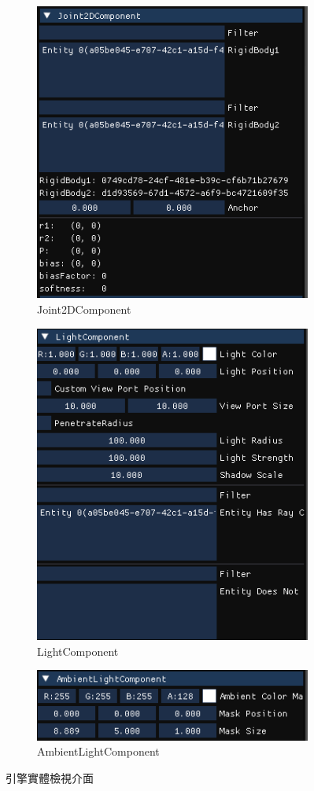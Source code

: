\begin{figure}[h]
\begin{subfigure}[b]{0.5\linewidth}
        \includegraphics[width=0.5\linewidth]{./resources/editor/ins_joint2D.png}
        \caption{Joint2DComponent}
    \end{subfigure}
    \begin{subfigure}[b]{0.5\linewidth}
        \includegraphics[width=0.5\linewidth]{./resources/editor/ins_light.png}
        \caption{LightComponent}
    \end{subfigure}
    \begin{subfigure}[b]{0.5\linewidth}
        \includegraphics[width=0.5\linewidth]{./resources/editor/ins_ambient.png}
        \caption{AmbientLightComponent}
    \end{subfigure}
\caption{引擎實體檢視介面}
\label{fig:Inspector}
\end{figure}

\newpage

